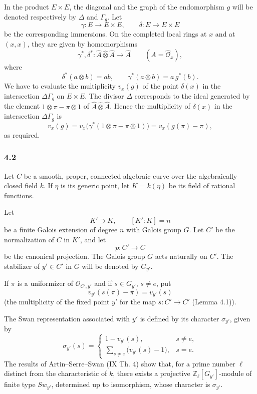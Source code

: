 \documentclass[11pt]{article}
\begin{document}
In the product $E\times E$, the diagonal and the graph of the endomorphism $g$ will be denoted respectively by $\Delta$ and $\Gamma_g$. Let
\[
\gamma:E\longrightarrow E\times E,\qquad
\delta:E\longrightarrow E\times E
\]
be the corresponding immersions. On the completed local rings at $x$ and at $(x,x)$, they are given by homomorphisms
\[
\gamma^*,\delta^*:\widehat A\widehat\otimes\widehat A\longrightarrow \widehat A
\qquad (A=\widehat{\mathcal O}_x),
\]
where
\[
\delta^*(a\otimes b)=ab,\qquad
\gamma^*(a\otimes b)=a\,g^*(b).
\]
We have to evaluate the multiplicity $v_x(g)$ of the point $\delta(x)$ in the intersection $\Delta\Gamma_g$ on $E\times E$. The divisor $\Delta$ corresponds to the ideal generated by the element $1\otimes\pi-\pi\otimes1$ of $\widehat A\widehat\otimes\widehat A$. Hence the multiplicity of $\delta(x)$ in the intersection $\Delta\Gamma_g$ is
\[
v_x(g)=v_x\bigl(\gamma^*(1\otimes\pi-\pi\otimes1)\bigr)
      =v_x(g(\pi)-\pi),
\]
as required.

\subsubsection*{4.2}

Let $C$ be a smooth, proper, connected algebraic curve over the algebraically closed field $k$. If $\eta$ is its generic point, let $K=k(\eta)$ be its field of rational functions.

Let
\[
K'\supset K,\qquad [K':K]=n
\]
be a finite Galois extension of degree $n$ with Galois group $G$. Let $C'$ be the normalization of $C$ in $K'$, and let
\[
p:C'\longrightarrow C
\]
be the canonical projection. The Galois group $G$ acts naturally on $C'$. The stabilizer of $y'\in C'$ in $G$ will be denoted by $G_{y'}$.

If $\pi$ is a uniformizer of $\mathcal O_{C',y'}$ and if $s\in G_{y'}$, $s\ne e$, put
\[
v_{y'}(s(\pi)-\pi)=v_{y'}(s)
\tag{4.2.1}
\]
(the multiplicity of the fixed point $y'$ for the map $s:C'\to C'$ (Lemma 4.1)).

The Swan representation associated with $y'$ is defined by its character $\sigma_{y'}$, given by
\[
\sigma_{y'}(s)=
\begin{cases}
1-v_{y'}(s),& s\ne e,\\[0.4em]
\displaystyle\sum_{s\ne e}\bigl(v_{y'}(s)-1\bigr),& s=e.
\end{cases}
\tag{4.2.2}
\]
The results of Artin--Serre--Swan (IX Th. 4) show that, for a prime number $\ell$ distinct from the characteristic of $k$, there exists a projective $\mathbb Z_\ell[G_{y'}]$-module of finite type $Sw_{y'}$, determined up to isomorphism, whose character is $\sigma_{y'}$.
\end{document}
